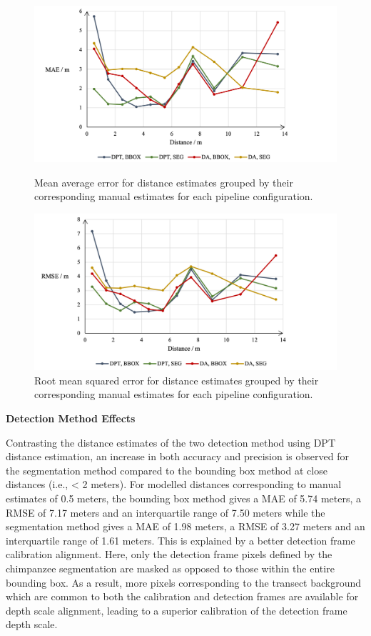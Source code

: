 \begin{figure}[H]
    \vspace{1cm}
    \centering
    \includegraphics[width=1.01\textwidth]{body/analysis/assets/errors/MAE}
    \caption{Mean average error for distance estimates grouped by their corresponding manual
    estimates for each pipeline configuration.}
    \label{fig:mae}

    \vspace{2cm}

    \includegraphics[width=1.01\textwidth]{body/analysis/assets/errors/RMSE}
    \caption{Root mean squared error for distance estimates grouped by their corresponding manual
    estimates for each pipeline configuration.}
    \label{fig:rmse}
\end{figure}

\clearpage

\textbf{Detection Method Effects}

Contrasting the distance estimates of the two detection method using DPT distance estimation,
an increase in both accuracy and precision is observed for the segmentation method compared
to the bounding box method at close distances (i.e., < 2 meters).
For modelled distances corresponding to manual estimates of 0.5 meters, the bounding box
method gives a MAE of 5.74 meters, a RMSE of 7.17 meters and an interquartile range of 7.50
meters while the segmentation method gives a MAE of 1.98 meters, a RMSE of 3.27 meters and
an interquartile range of 1.61 meters.
This is explained by a better detection frame calibration alignment.
Here, only the detection frame pixels defined by the chimpanzee segmentation are masked as
opposed to those within the entire bounding box.
As a result, more pixels corresponding to the transect background which are common to both
the calibration and detection frames are available for depth scale alignment, leading to a
superior calibration of the detection frame depth scale.


